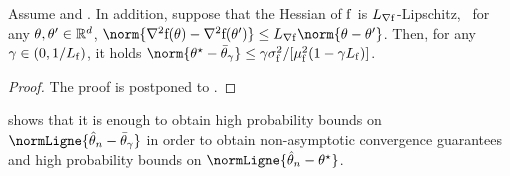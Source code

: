 %
\begin{lemma}
  \label{propo:bias}
  Assume  and . In addition, suppose that the Hessian of $\mathrm{f}$ is $L_{\nabla \mathrm{f}}$-Lipschitz, \ie~for any $\theta,\theta' \in \mathbb{R}^d$,
$\norm{\nabla^2\objf(\theta)-\nabla^2 \objf(\theta')} \leq \LipHessianf\norm{\theta-\theta'}$.
  Then, for any $\gamma \in \left(0,1/L_{\mathrm{f}}\right)$, it holds $    \norm{\thetas - \bar{\theta}_{\gamma}} \leq \gamma \sgvarfac /[\muf^2(1-\gamma \Lf)]$.
\end{lemma}
\begin{proof}
The proof is postponed to .
\end{proof}
 shows that it is enough to obtain high probability bounds on $\normLigne{\hat{\theta}_n -   \bar{\theta}_{\gamma}}$ in order to obtain non-asymptotic convergence guarantees and high probability bounds on $\normLigne{\hat{\theta}_n - \thetas}$.






